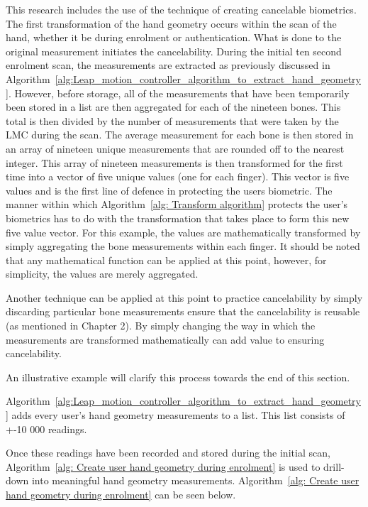 This research includes the use of the technique of creating cancelable biometrics. The first transformation of the hand geometry occurs within the scan of the hand, whether it be during enrolment or authentication. What is done to the original measurement initiates the cancelability. During the initial ten second enrolment scan, the measurements are extracted as previously discussed in Algorithm~\ref{alg:Leap_motion_controller_algorithm_to_extract_hand_geometry}. However, before storage, all of the measurements that have been temporarily been stored in a list are then aggregated for each of the nineteen bones. This total is then divided by the number of measurements that were taken by the LMC during the scan. The average measurement for each bone is then stored in an array of nineteen unique measurements that are rounded off to the nearest integer. This array of nineteen measurements is then transformed for the first time into a vector of five unique values (one for each finger). This vector is five values and is the first line of defence in protecting the users biometric. The manner within which Algorithm~\ref{alg: Transform algorithm} protects the user's biometrics has to do with the transformation that takes place to form this new five value vector. For this example, the values are mathematically transformed by simply aggregating the bone measurements within each finger. It should be noted that any mathematical function can be applied at this point, however, for simplicity, the values are merely aggregated. 

Another technique can be applied at this point to practice cancelability by simply discarding particular bone measurements ensure that the cancelability is reusable (as mentioned in Chapter 2). By simply changing the way in which the measurements are transformed mathematically can add value to ensuring cancelability. 

An illustrative example will clarify this process towards the end of this section.


Algorithm~\ref{alg:Leap_motion_controller_algorithm_to_extract_hand_geometry} adds every user's hand geometry measurements to a list. This list consists of +-10 000 readings.

Once these readings have been recorded and stored during the initial scan, Algorithm~\ref{alg: Create user hand geometry during enrolment} is used to drill-down into meaningful hand geometry measurements. Algorithm~\ref{alg: Create user hand geometry during enrolment} can be seen below.

